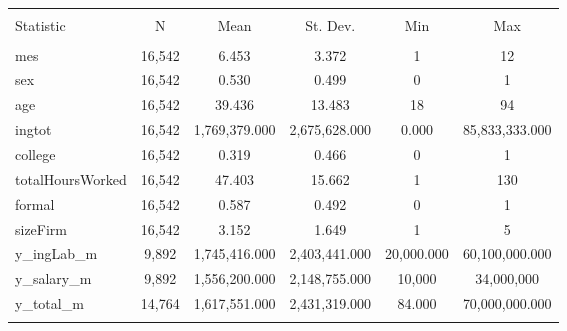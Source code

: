 
\begin{table}[!htbp] \centering 
  \caption{} 
  \label{} 
\begin{tabular}{@{\extracolsep{5pt}}lccccc} 
\\[-1.8ex]\hline 
\hline \\[-1.8ex] 
Statistic & \multicolumn{1}{c}{N} & \multicolumn{1}{c}{Mean} & \multicolumn{1}{c}{St. Dev.} & \multicolumn{1}{c}{Min} & \multicolumn{1}{c}{Max} \\ 
\hline \\[-1.8ex] 
mes & 16,542 & 6.453 & 3.372 & 1 & 12 \\ 
sex & 16,542 & 0.530 & 0.499 & 0 & 1 \\ 
age & 16,542 & 39.436 & 13.483 & 18 & 94 \\ 
ingtot & 16,542 & 1,769,379.000 & 2,675,628.000 & 0.000 & 85,833,333.000 \\ 
college & 16,542 & 0.319 & 0.466 & 0 & 1 \\ 
totalHoursWorked & 16,542 & 47.403 & 15.662 & 1 & 130 \\ 
formal & 16,542 & 0.587 & 0.492 & 0 & 1 \\ 
sizeFirm & 16,542 & 3.152 & 1.649 & 1 & 5 \\ 
y\_ingLab\_m & 9,892 & 1,745,416.000 & 2,403,441.000 & 20,000.000 & 60,100,000.000 \\ 
y\_salary\_m & 9,892 & 1,556,200.000 & 2,148,755.000 & 10,000 & 34,000,000 \\ 
y\_total\_m & 14,764 & 1,617,551.000 & 2,431,319.000 & 84.000 & 70,000,000.000 \\ 
\hline \\[-1.8ex] 
\end{tabular} 
\end{table} 